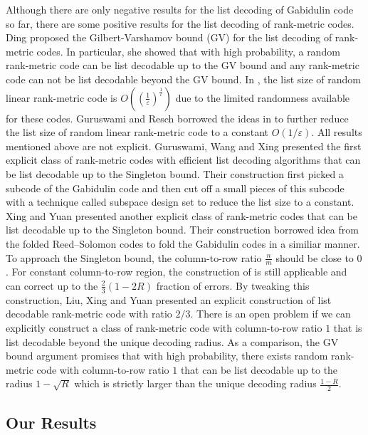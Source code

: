 \documentclass[11pt]{article}
\theoremstyle{plain}
\theoremstyle{definition}
\theoremstyle{remark}
\renewcommand{\epsilon}{\varepsilon}
\begin{document}
Although there are only negative results for the list decoding of Gabidulin code so far, there are some positive results for the list decoding of rank-metric codes. Ding \cite{ding2014list} proposed the Gilbert-Varshamov bound (GV) for the list decoding of rank-metric codes. In particular, she showed that with high probability, a random rank-metric code can be list decodable up to the GV bound and any rank-metric code can not be list decodable beyond the GV bound. 
In \cite{ding2014list}, the list size of random linear rank-metric code is $O((\frac{1}{\epsilon})^\frac{1}{\epsilon})$ due to the limited randomness available for these codes.
Guruswami and Resch \cite{GR18} borrowed the ideas in \cite{GHK10} to further reduce the list size of random linear rank-metric code to a constant $O(1/\epsilon)$. 
All results mentioned above are not explicit. 
Guruswami, Wang and Xing \cite{GWX16} presented the first explicit class of rank-metric codes with efficient list decoding algorithms that can be list decodable up to the Singleton bound. Their construction first picked a subcode of the Gabidulin code and then cut off a small pieces of this subcode with a technique called subspace design set \cite{GK13} to reduce the list size to a constant.
Xing and Yuan \cite{XY18} presented another explicit class of rank-metric codes that can be list decodable up to the Singleton bound. Their construction borrowed idea from the folded Reed--Solomon codes to fold the Gabidulin codes in a similiar manner. To approach the Singleton bound, the  column-to-row ratio $\frac{n}{m}$ should be close to $0$. For constant column-to-row region, the construction of \cite{XY18} is still applicable and can correct up to the $\frac{2}{3}(1-2R)$ fraction of errors. By tweaking this construction, Liu, Xing and Yuan \cite{LYX23} presented an explicit construction of list decodable rank-metric code with ratio $2/3$. There is an open problem if we can explicitly construct a class of rank-metric code with column-to-row ratio $1$ that is list decodable beyond the unique decoding radius. As a comparison, the GV bound argument promises that with high probability, there exists random rank-metric code with column-to-row ratio $1$ that can be list decodable up to the radius $1-\sqrt{R}$ which is strictly larger than the unique decoding radius $\frac{1-R}{2}$.    

\fi

\subsection{Our Results} 
\end{document}
